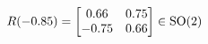 \documentclass[preview]{standalone}
\begin{document}
\begin{align*}
\special{dvisvgm:raw <g id='unique000'>}R(-0.85) = \begin{bmatrix} 0.66 & 0.75 \\ -0.75 & 0.66 \end{bmatrix} \in \text{SO}(2)\special{dvisvgm:raw </g>}
\end{align*}
\end{document}
